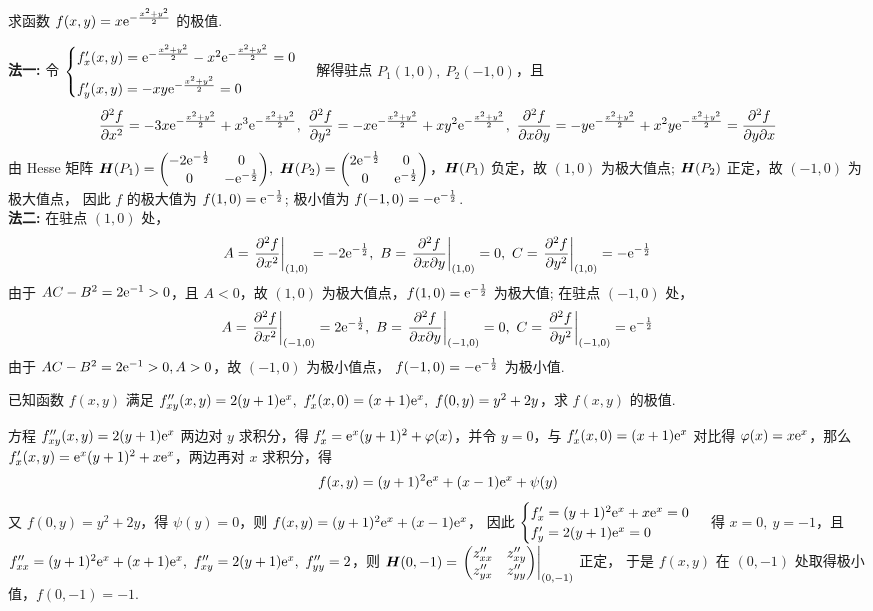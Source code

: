 \begin{example}[2012 数一]
    求函数 $f(x,y)=x\mathrm{e}^{-\frac{x^2+y^2}{2}}$ 的极值.
\end{example}
\begin{solution}
    \textbf{法一: }令 $\begin{cases}
        f_x'(x,y)=\mathrm{e}^{-\frac{x^2+y^2}{2}}-x^2\mathrm{e}^{-\frac{x^2+y^2}{2}}=0\\[6pt]
        f_y'(x,y)=-xy \mathrm{e}^{-\frac{x^2+y^2}{2}}=0
    \end{cases}$ 解得驻点 $P_1(1,0),~P_2(-1,0)$，且 
    $$\pdv[2]{f}{x}=-3x\mathrm{e}^{-\frac{x^2+y^2}{2}}+x^3\mathrm{e}^{-\frac{x^2+y^2}{2}},~\pdv[2]{f}{y}=-x\mathrm{e}^{-\frac{x^2+y^2}{2}}+xy^2\mathrm{e}^{-\frac{x^2+y^2}{2}},~\pdv{f}{x}{y}=-y\mathrm{e}^{-\frac{x^2+y^2}{2}}+x^2y\mathrm{e}^{-\frac{x^2+y^2}{2}}=\pdv{f}{y}{x}$$
    由 Hesse 矩阵 $\vb*{H}(P_1)=\mqty(-2\e^{-\frac{1}{2}}&0\\0&-\e^{-\frac{1}{2}}),~\vb*{H}(P_2)=\mqty(2\e^{-\frac{1}{2}}&0\\0&\e^{-\frac{1}{2}})$，$\vb*{H}(P_1)$ 负定，故 $(1,0)$ 为极大值点; $\vb*{H}(P_2)$ 正定，故 $(-1,0)$ 为极大值点，
    因此 $f$ 的极大值为 $f(1,0)=\mathrm{e}^{-\frac{1}{2}}$; 极小值为 $f(-1,0)=-\mathrm{e}^{-\frac{1}{2}}$.\\
    \textbf{法二: }在驻点 $ (1,0) $ 处，
    $$A=\left.\frac{\partial^{2} f}{\partial x^{2}}\right|_{(1,0)}=-2 \mathrm{e}^{-\frac{1}{2}},~ B=\left.\frac{\partial^{2} f}{\partial x \partial y}\right|_{(1,0)}=0,~ C=\left.\frac{\partial^{2} f}{\partial y^{2}}\right|_{(1,0)}=-\mathrm{e}^{-\frac{1}{2}}  $$
    由于 $ A C-B^{2}=2 \mathrm{e}^{-1}>0 $，且 $ A<0$，故 $ (1,0) $ 为极大值点，$f(1,0)=\mathrm{e}^{-\frac{1}{2}} $ 为极大值; 在驻点 $ (-1,0) $ 处，
    $$A=\left.\frac{\partial^{2} f}{\partial x^{2}}\right|_{(-1,0)}=2 \mathrm{e}^{-\frac{1}{2}},~ B=\left.\frac{\partial^{2} f}{\partial x \partial y}\right|_{(-1,0)}=0,~ C=\left.\frac{\partial^{2} f}{\partial y^{2}}\right|_{(-1,0)}=\mathrm{e}^{-\frac{1}{2}}$$
    由于 $ A C-B^{2}=2 \mathrm{e}^{-1}>0, A>0 $，故 $ (-1,0) $ 为极小值点， $f(-1,0)=-\mathrm{e}^{-\frac{1}{2}} $ 为极小值.
\end{solution}

\begin{example}[2015 数二]
    已知函数 $f(x,y)$ 满足 $f''_{xy}(x,y)=2(y+1)\mathrm{e}^x,~f'_x(x,0)=(x+1)\mathrm{e}^x,~f(0,y)=y^2+2y$，求 $f(x,y)$ 的极值.
\end{example}
\begin{solution}
    方程 $f''_{xy}(x,y)=2(y+1)\mathrm{e}^x$ 两边对 $y$ 求积分，得 $f'_x=\mathrm{e}^x(y+1)^2+\varphi(x)$，并令 $y=0$，与 $f'_x(x,0)=(x+1)\mathrm{e}^x$ 对比得 $\varphi(x)=x\mathrm{e} ^x$，那么 
    $f'_x(x,y)=\mathrm{e}^x(y+1)^2+x\mathrm{e}^x$，两边再对 $x$ 求积分，得 $$f(x,y)=(y+1)^2\mathrm{e} ^x+(x-1)\mathrm{e} ^x+\psi(y)$$
    又 $f(0,y)=y^2+2y$，得 $\psi(y)=0$，则 $f(x,y)=(y+1)^2\mathrm{e} ^x+(x-1)\mathrm{e} ^x$，
    因此 $\begin{cases}
        f'_x=(y+1)^2\mathrm{e} ^x+x\mathrm{e} ^x=0\\ 
        f'_y=2(y+1)\mathrm{e} ^x=0
    \end{cases}$ 得 $x=0,~y=-1$，且 $f''_{xx}=(y+1)^2\mathrm{e} ^x+(x+1)\mathrm{e} ^x,~f''_{xy}=2(y+1)\mathrm{e} ^x,~f''_{yy}=2$，则 $\vb*{H}(0,-1)=\eval{\mqty(z''_{xx}&z''_{xy}\\z''_{yx}&z''_{yy})}_{(0,-1)}$ 正定，
    于是 $f(x,y)$ 在 $(0,-1)$ 处取得极小值，$f(0,-1)=-1.$
\end{solution}

